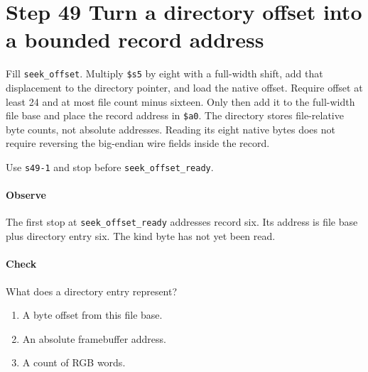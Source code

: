 \section{Step 49 Turn a directory offset into a bounded record address}
Fill \texttt{seek\_offset}. Multiply \texttt{\$s5} by eight with a full-width shift, add that displacement to the directory pointer, and load the native offset. Require offset at least 24 and at most file count minus sixteen. Only then add it to the full-width file base and place the record address in \texttt{\$a0}. The directory stores file-relative byte counts, not absolute addresses. Reading its eight native bytes does not require reversing the big-endian wire fields inside the record.

Use \texttt{s49-1} and stop before \texttt{seek\_offset\_ready}.

\paragraph{Observe} The first stop at \texttt{seek\_offset\_ready} addresses record six. Its address is file base plus directory entry six. The kind byte has not yet been read.

\paragraph{Check} What does a directory entry represent?
\begin{enumerate}[label=\Alph*.]
  \item A byte offset from this file base.
  \item An absolute framebuffer address.
  \item A count of RGB words.
\end{enumerate}

